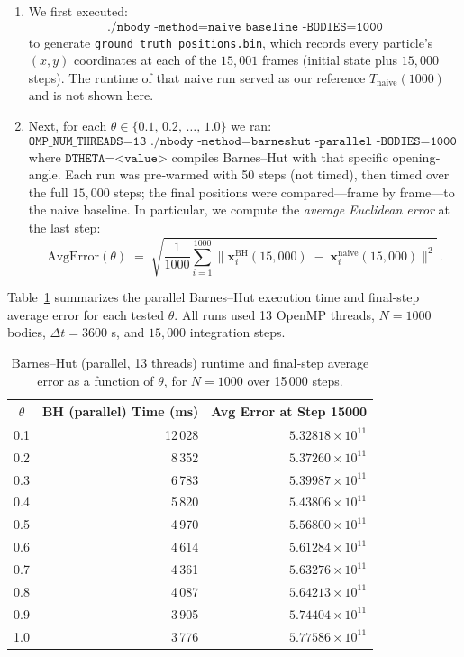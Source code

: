 \documentclass{article}
\begin{document}
\begin{enumerate}
  \item We first executed:
  \[
    \texttt{./nbody -method=naive\_baseline -BODIES=1000}
  \]
  to generate \texttt{ground\_truth\_positions.bin}, which records every particle’s \((x,y)\) coordinates at each of the \(15{,}001\) frames (initial state plus \(15{,}000\) steps).  The runtime of that naive run served as our reference \(T_{\text{naive}}(1000)\) and is not shown here.

  \item Next, for each \(\theta\in\{0.1,\,0.2,\,\dots,\,1.0\}\) we ran:
  \[
    \texttt{OMP\_NUM\_THREADS=13 ./nbody -method=barneshut -parallel -BODIES=1000 -DTHETA=<value>}
  \]
  where \(\texttt{DTHETA=<value>}\) compiles Barnes–Hut with that specific opening‐angle.  Each run was pre‐warmed with 50 steps (not timed), then timed over the full \(15{,}000\) steps; the final positions were compared—frame by frame—to the naive baseline.  In particular, we compute the \emph{average Euclidean error} at the last step:
  \[
    \text{AvgError}(\theta) \;=\; 
      \sqrt{\frac{1}{1000}\sum_{i=1}^{1000} \bigl\lVert 
        \mathbf{x}_i^{\text{BH}}(15{,}000)\;-\;\mathbf{x}_i^{\text{naive}}(15{,}000)\bigr\rVert^2}\,.
  \]
\end{enumerate}

Table~\ref{tab:theta_tuning} summarizes the parallel Barnes–Hut execution time and final‐step average error for each tested \(\theta\).  All runs used 13 OpenMP threads, \(N=1000\) bodies, \(\Delta t = 3600\) s, and \(15{,}000\) integration steps.

\begin{table}[H]
    \centering
    \begin{tabular}{|c|r|r|}
      \hline
      \(\theta\) 
        & \multicolumn{1}{c|}{\textbf{BH (parallel) Time (ms)}} 
        & \multicolumn{1}{c|}{\textbf{Avg Error at Step 15000}} \\
      \hline
      0.1  & 12\,028  & \(5.32818\times10^{11}\) \\
      0.2  &  8\,352  & \(5.37260\times10^{11}\) \\
      0.3  &  6\,783  & \(5.39987\times10^{11}\) \\
      0.4  &  5\,820  & \(5.43806\times10^{11}\) \\
      0.5  &  4\,970  & \(5.56800\times10^{11}\) \\
      0.6  &  4\,614  & \(5.61284\times10^{11}\) \\
      0.7  &  4\,361  & \(5.63276\times10^{11}\) \\
      0.8  &  4\,087  & \(5.64213\times10^{11}\) \\
      0.9  &  3\,905  & \(5.74404\times10^{11}\) \\
      1.0  &  3\,776  & \(5.77586\times10^{11}\) \\
      \hline
    \end{tabular}
    \caption{Barnes–Hut (parallel, 13 threads) runtime and final‐step average error as a function of \(\theta\), for \(N=1000\) over 15\,000 steps.}
    \label{tab:theta_tuning}
\end{table}
\end{document}
